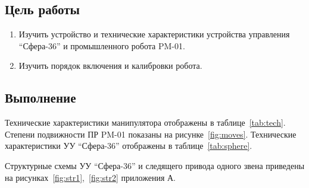 \subsection*{Цель работы}

\begin{enumerate}
    \item Изучить устройство и технические характеристики устройства управления ``Сфера-36'' и промышленного робота PM-01.
    \item Изучить порядок включения и калибровки робота.
\end{enumerate}

\subsection*{Выполнение}

Технические характеристики манипулятора отображены в таблице~\ref{tab:tech}. Степени подвижности ПР PM-01 показаны на рисунке~\ref{fig:moves}. Технические характеристики УУ ``Сфера-36'' отображены в таблице~\ref{tab:sphere}.

Структурные схемы УУ ``Сфера-36'' и следящего привода одного звена приведены на рисунках~\ref{fig:str1},~\ref{fig:str2} приложения А.

